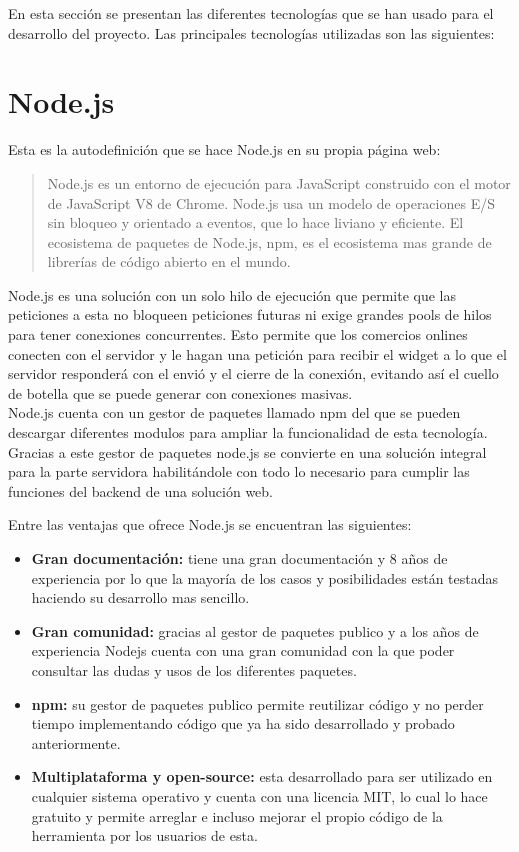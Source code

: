 En esta sección se presentan las diferentes tecnologías que se han usado para el desarrollo del proyecto. Las principales tecnologías utilizadas son las siguientes:

\section{Node.js}
Esta es la autodefinición que se hace Node.js en su propia página web:

\begin{quote}
	Node.js\cite{wsdl13} es un entorno de ejecución para JavaScript construido con el motor de JavaScript V8 de Chrome. Node.js usa un modelo de operaciones E/S sin bloqueo y orientado a eventos, que lo hace liviano y eficiente. El ecosistema de paquetes de Node.js, npm, es el ecosistema mas grande de librerías de código abierto en el mundo.\\
\end{quote}


Node.js es una solución con un solo hilo de ejecución que permite que las peticiones a esta no bloqueen peticiones futuras ni exige grandes pools de hilos para tener conexiones concurrentes. Esto permite que los comercios onlines conecten con el servidor y le hagan una petición para recibir el widget a lo que el servidor responderá con el envió y el cierre de la conexión, evitando así el cuello de botella que se puede generar con conexiones masivas.\\

Node.js cuenta con un gestor de paquetes llamado npm del que se pueden descargar diferentes modulos para ampliar la funcionalidad de esta tecnología. Gracias a este gestor de paquetes node.js se convierte en una solución integral para la parte servidora habilitándole con todo lo necesario para cumplir las funciones del backend de una solución web.

Entre las ventajas que ofrece Node.js se encuentran las siguientes:

\begin{itemize}
	\item \textbf{Gran documentación:} tiene una gran documentación y 8 años de experiencia por lo que la mayoría de los casos y posibilidades están testadas haciendo su desarrollo mas sencillo.
	\item \textbf{Gran comunidad:} gracias al gestor de paquetes publico y a los años de experiencia Nodejs cuenta con una gran comunidad con la que poder consultar las dudas y usos de los diferentes paquetes.
	\item \textbf{npm:} su gestor de paquetes publico  permite reutilizar código y no perder tiempo implementando código que ya ha sido desarrollado y probado anteriormente.
	\item \textbf{Multiplataforma y open-source:} esta desarrollado para ser utilizado en cualquier sistema operativo y cuenta con una licencia MIT, lo cual lo hace gratuito y permite arreglar e incluso mejorar el propio código de la herramienta por los usuarios de esta.
\end{itemize}

